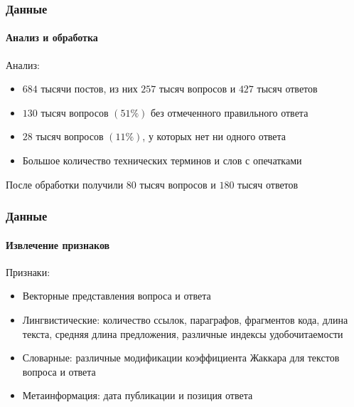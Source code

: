 \documentclass[10pt]{beamer}
\begin{document}

\begin{frame}
\frametitle{Данные}
\framesubtitle{Анализ и обработка}

Анализ:

\begin{itemize}
	\item $684$ тысячи постов, из них $257$ тысяч вопросов и $427$ тысяч ответов
	\item $130$ тысяч вопросов $(51\%)$ без отмеченного правильного ответа
	\item $28$ тысяч вопросов $(11\%)$, у которых нет ни одного ответа
	\item Большое количество технических терминов и слов с опечатками
\end{itemize}

После обработки получили $80$ тысяч вопросов и $180$ тысяч ответов

\end{frame}


\begin{frame}
\frametitle{Данные}
\framesubtitle{Извлечение признаков}

Признаки:

\begin{itemize}
	\item Векторные представления вопроса и ответа
	\item Лингвистические: количество ссылок, параграфов, фрагментов кода, длина текста, средняя длина предложения, различные индексы удобочитаемости
	\item Словарные: различные модификации коэффициента Жаккара для текстов вопроса и ответа
	\item Метаинформация: дата публикации и позиция ответа
\end{itemize}

\end{frame}

\end{document}
